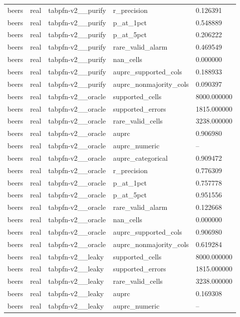 \begin{tabular}{lllll}
beers & real & tabpfn-v2\_\_purify & r\_precision & 0.126391 \\
beers & real & tabpfn-v2\_\_purify & p\_at\_1pct & 0.548889 \\
beers & real & tabpfn-v2\_\_purify & p\_at\_5pct & 0.206222 \\
beers & real & tabpfn-v2\_\_purify & rare\_valid\_alarm & 0.469549 \\
beers & real & tabpfn-v2\_\_purify & nan\_cells & 0.000000 \\
beers & real & tabpfn-v2\_\_purify & auprc\_supported\_cols & 0.188933 \\
beers & real & tabpfn-v2\_\_purify & auprc\_nonmajority\_cols & 0.090397 \\
beers & real & tabpfn-v2\_\_oracle & supported\_cells & 8000.000000 \\
beers & real & tabpfn-v2\_\_oracle & supported\_errors & 1815.000000 \\
beers & real & tabpfn-v2\_\_oracle & rare\_valid\_cells & 3238.000000 \\
beers & real & tabpfn-v2\_\_oracle & auprc & 0.906980 \\
beers & real & tabpfn-v2\_\_oracle & auprc\_numeric & -- \\
beers & real & tabpfn-v2\_\_oracle & auprc\_categorical & 0.909472 \\
beers & real & tabpfn-v2\_\_oracle & r\_precision & 0.776309 \\
beers & real & tabpfn-v2\_\_oracle & p\_at\_1pct & 0.757778 \\
beers & real & tabpfn-v2\_\_oracle & p\_at\_5pct & 0.951556 \\
beers & real & tabpfn-v2\_\_oracle & rare\_valid\_alarm & 0.122668 \\
beers & real & tabpfn-v2\_\_oracle & nan\_cells & 0.000000 \\
beers & real & tabpfn-v2\_\_oracle & auprc\_supported\_cols & 0.906980 \\
beers & real & tabpfn-v2\_\_oracle & auprc\_nonmajority\_cols & 0.619284 \\
beers & real & tabpfn-v2\_\_leaky & supported\_cells & 8000.000000 \\
beers & real & tabpfn-v2\_\_leaky & supported\_errors & 1815.000000 \\
beers & real & tabpfn-v2\_\_leaky & rare\_valid\_cells & 3238.000000 \\
beers & real & tabpfn-v2\_\_leaky & auprc & 0.169308 \\
beers & real & tabpfn-v2\_\_leaky & auprc\_numeric & -- \\

\end{tabular}
